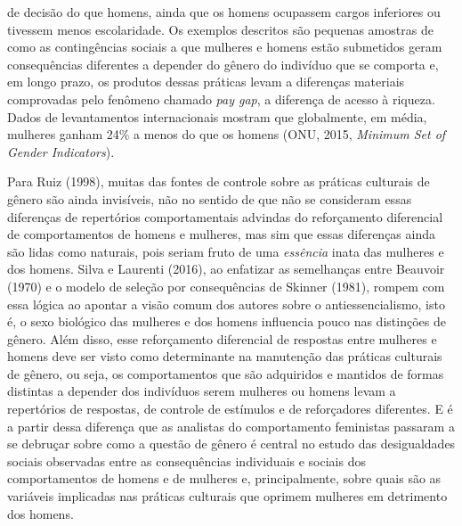 de decisão do que homens, ainda que os homens ocupassem cargos inferiores ou tivessem menos escolaridade. Os exemplos descritos são pequenas amostras de como as contingências sociais a que mulheres e homens estão submetidos geram consequências diferentes a depender do gênero do indivíduo que se comporta e, em longo prazo, os produtos dessas práticas levam a diferenças materiais comprovadas pelo fenômeno chamado \textit{pay gap}, a diferença de acesso à riqueza. Dados de levantamentos internacionais mostram que globalmente, em média, mulheres ganham 24\% a menos do que os homens (ONU, 2015, \textit{Minimum Set of Gender Indicators}).

Para Ruiz (1998), muitas das fontes de controle sobre as práticas culturais de gênero são ainda invisíveis, não no sentido de que não se consideram essas diferenças de repertórios comportamentais advindas do reforçamento diferencial de comportamentos de homens e mulheres, mas sim que essas diferenças ainda são lidas como naturais, pois seriam fruto de uma \textit{essência} inata das mulheres e dos homens. Silva e Laurenti (2016), ao enfatizar as semelhanças entre Beauvoir (1970) e o modelo de seleção por consequências de Skinner (1981), rompem com essa lógica ao apontar a visão comum dos autores sobre o antiessencialismo, isto é, o sexo biológico das mulheres e dos homens influencia pouco nas distinções de gênero. Além disso, esse reforçamento diferencial de respostas entre mulheres e homens deve ser visto como determinante na manutenção das práticas culturais de gênero, ou seja, os comportamentos que são adquiridos e mantidos de formas distintas a depender dos indivíduos serem mulheres ou homens levam a repertórios de respostas, de controle de estímulos e de reforçadores diferentes. E é a partir dessa diferença que as analistas do comportamento feministas passaram a se debruçar sobre como a questão de gênero é central no estudo das desigualdades sociais observadas entre as consequências individuais e sociais dos comportamentos de homens e de mulheres e, principalmente, sobre quais são as variáveis implicadas nas práticas culturais que oprimem mulheres em detrimento dos homens.

